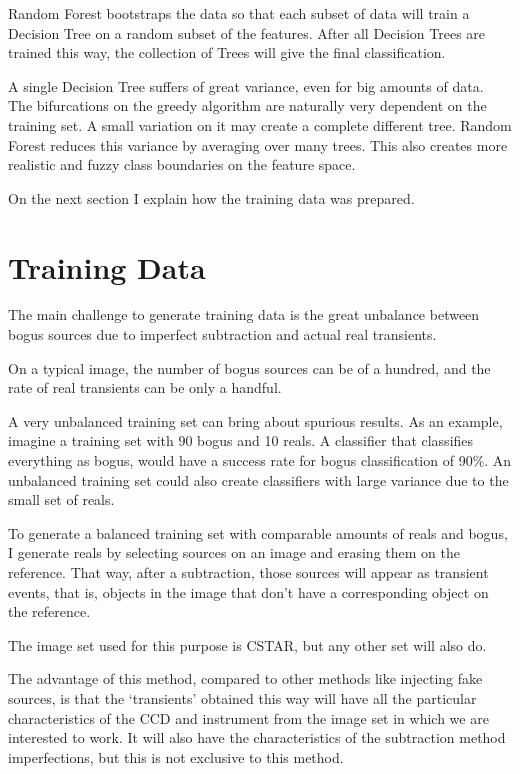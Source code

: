 Random Forest bootstraps the data so that each subset of data will train a Decision Tree on a random subset of the features. After all Decision Trees are trained this way, the collection of Trees will give the final classification.

A single Decision Tree suffers of great variance, even for big amounts of data. The bifurcations on the greedy algorithm are naturally very dependent on the training set. A small variation on it may create a complete different tree. Random Forest reduces this variance by averaging over many trees. This also creates more realistic and fuzzy class boundaries on the feature space.

On the next section I explain how the training data was prepared.

\section{Training Data}

The main challenge to generate training data is the great unbalance between bogus sources due to imperfect subtraction and actual real transients.

On a typical image, the number of bogus sources can be of a hundred, and the rate of real transients can be only a handful.

A very unbalanced training set can bring about spurious results. As an example, imagine a training set with 90 bogus and 10 reals. A classifier that classifies everything as bogus, would have a success rate for bogus classification of 90\%. An unbalanced training set could also create classifiers with large variance due to the small set of reals.

To generate a balanced training set with comparable amounts of reals and bogus, I generate reals by selecting sources on an image and erasing them on the reference. That way, after a subtraction, those sources will appear as transient events, that is, objects in the image that don't have a corresponding object on the reference.

The image set used for this purpose is CSTAR, but any other set will also do.

The advantage of this method, compared to other methods like injecting fake sources, is that the `transients' obtained this way will have all the particular characteristics of the CCD and instrument from the image set in which we are interested to work. It will also have the characteristics of the subtraction method imperfections, but this is not exclusive to this method.

